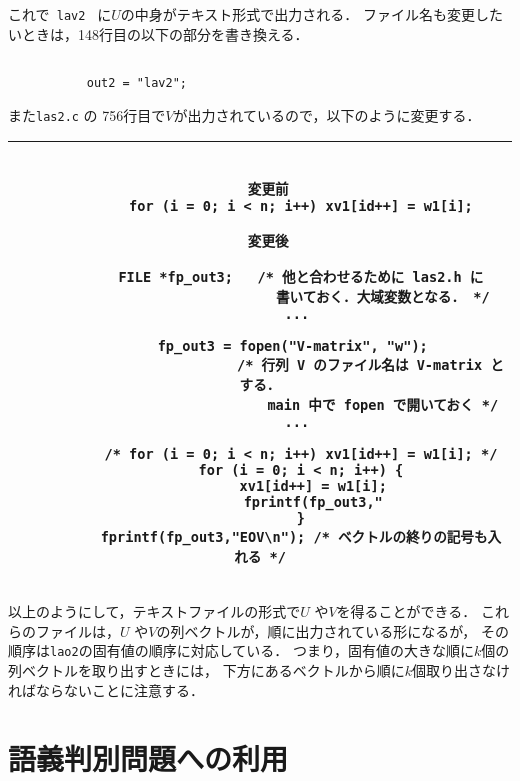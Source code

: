 \bigskip

これで\verb| lav2 | に\( U \)の中身がテキスト形式で出力される．
ファイル名も変更したいときは，148行目の以下の部分を書き換える．
\begin{verbatim}

           out2 = "lav2";

\end{verbatim}

また{\tt las2.c} の 756行目で\( V \)が出力されているので，以下のように変更する．

\bigskip

\small
\begin{tabular}{|c|} \hline
\begin{minipage}[H]{134mm}
\begin{verbatim}

  変更前
          for (i = 0; i < n; i++) xv1[id++] = w1[i];

  変更後
        
          FILE *fp_out3;   /* 他と合わせるために las2.h に
                              書いておく．大域変数となる． */
          ... 

          fp_out3 = fopen("V-matrix", "w");  
                           /* 行列 V のファイル名は V-matrix とする．
                              main 中で fopen で開いておく */
          ... 
          
          /* for (i = 0; i < n; i++) xv1[id++] = w1[i]; */
          for (i = 0; i < n; i++) {
             xv1[id++] = w1[i];
             fprintf(fp_out3,"
          }
          fprintf(fp_out3,"EOV\n"); /* ベクトルの終りの記号も入れる */

\end{verbatim}
\end{minipage}
\\
\hline
\end{tabular}
\normalsize

\bigskip

以上のようにして，テキストファイルの形式で\( U \) や\( V \)を得ることができる．
これらのファイルは，\( U \) や\( V \)の列ベクトルが，順に出力されている形になるが，
その順序は{\tt lao2}の固有値の順序に対応している．
つまり，固有値の大きな順に\( k \)個の列ベクトルを取り出すときには，
下方にあるベクトルから順に\( k \)個取り出さなければならないことに注意する．


\section{語義判別問題への利用}


